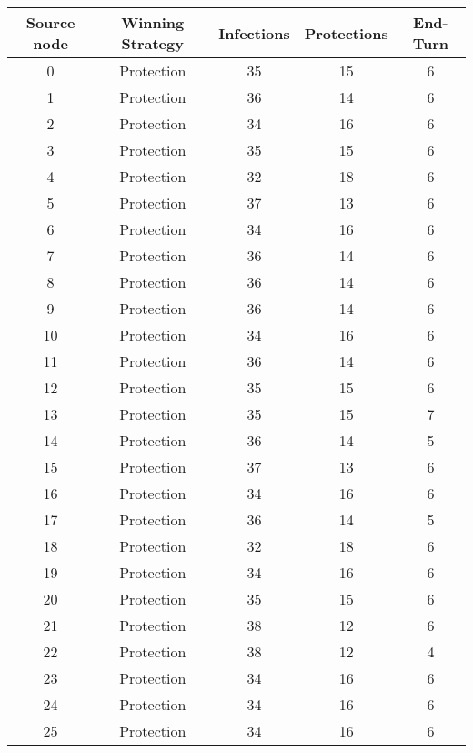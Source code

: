 \documentclass[results.tex]{subfiles}
\begin{document}
\begin{center}
  \begin{tabular}{| c || c | c | c | c |}
    \hline
    {\bfseries Source node} & {\bfseries Winning Strategy} & {\bfseries Infections} & {\bfseries Protections} & {\bfseries End-Turn} \\  %
    \hline\hline
    0 & Protection & 35 & 15 & 6 \\ 
    \hline
    1 & Protection & 36 & 14 & 6 \\ 
    \hline
    2 & Protection & 34 & 16 & 6 \\ 
    \hline
    3 & Protection & 35 & 15 & 6 \\ 
    \hline
    4 & Protection & 32 & 18 & 6 \\ 
    \hline
    5 & Protection & 37 & 13 & 6 \\ 
    \hline
    6 & Protection & 34 & 16 & 6 \\ 
    \hline
    7 & Protection & 36 & 14 & 6 \\ 
    \hline
    8 & Protection & 36 & 14 & 6 \\ 
    \hline
    9 & Protection & 36 & 14 & 6 \\ 
    \hline
    10 & Protection & 34 & 16 & 6 \\ 
    \hline
    11 & Protection & 36 & 14 & 6 \\ 
    \hline
    12 & Protection & 35 & 15 & 6 \\ 
    \hline
    13 & Protection & 35 & 15 & 7 \\ 
    \hline
    14 & Protection & 36 & 14 & 5 \\ 
    \hline
    15 & Protection & 37 & 13 & 6 \\ 
    \hline
    16 & Protection & 34 & 16 & 6 \\ 
    \hline
    17 & Protection & 36 & 14 & 5 \\ 
    \hline
    18 & Protection & 32 & 18 & 6 \\ 
    \hline
    19 & Protection & 34 & 16 & 6 \\ 
    \hline
    20 & Protection & 35 & 15 & 6 \\ 
    \hline
    21 & Protection & 38 & 12 & 6 \\ 
    \hline
    22 & Protection & 38 & 12 & 4 \\ 
    \hline
    23 & Protection & 34 & 16 & 6 \\ 
    \hline
    24 & Protection & 34 & 16 & 6 \\ 
    \hline
    25 & Protection & 34 & 16 & 6 \\ 

\end{tabular}
\end{center}
\end{document}
